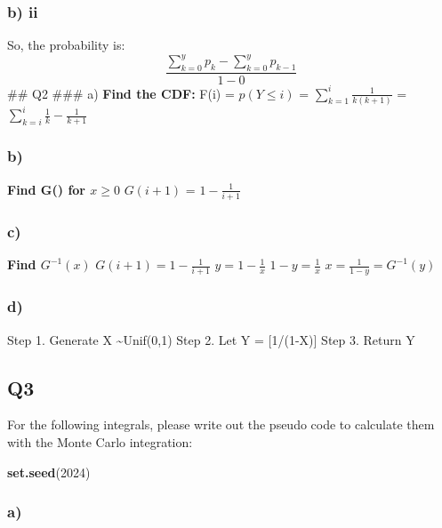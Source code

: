 \documentclass[
]{article}
\newenvironment{Shaded}{\begin{snugshade}}{\end{snugshade}}
\newcommand{\DecValTok}[1]{\textcolor[rgb]{0.00,0.00,0.81}{#1}}
\newcommand{\FunctionTok}[1]{\textcolor[rgb]{0.13,0.29,0.53}{\textbf{#1}}}
\newcommand{\NormalTok}[1]{#1}
\begin{document}
\hypertarget{b-ii}{%
\subsubsection{b) ii}\label{b-ii}}

So, the probability is:
\[\frac{\sum^{y}_{k=0}{p_{k}}-\sum^{y}_{k=0}{p_{k-1}}}{1-0}\] \#\# Q2
\#\#\# a) \textbf{Find the CDF:} F(i) = \(p(Y \le i)\) =
\(\sum^{i}_{k=1}{\frac{1}{k(k+1)}}\) =
\(\sum^{i}_{k=i}{\frac{1}{k}-\frac{1}{k+1}}\)

\hypertarget{b}{%
\subsubsection{b)}\label{b}}

\textbf{Find G() for \(x \ge 0\)} \(G(i + 1)\) = \(1-\frac{1}{i+1}\)

\hypertarget{c}{%
\subsubsection{c)}\label{c}}

\textbf{Find \(G^{-1}(x)\)} \(G(i+1) = 1-\frac{1}{i+1}\)
\(y=1-\frac{1}{x}\) \(1-y=\frac{1}{x}\) \(x=\frac{1}{1-y} = G^{-1}(y)\)

\hypertarget{d}{%
\subsubsection{d)}\label{d}}

Step 1. Generate X \textasciitilde Unif(0,1) Step 2. Let Y =
{[}1/(1-X){]} Step 3. Return Y

\hypertarget{q3}{%
\subsection{Q3}\label{q3}}

For the following integrals, please write out the pseudo code to
calculate them with the Monte Carlo integration:

\begin{Shaded}
\begin{Highlighting}[]
\FunctionTok{set.seed}\NormalTok{(}\DecValTok{2024}\NormalTok{)}
\end{Highlighting}
\end{Shaded}

\hypertarget{a}{%
\subsubsection{a)}\label{a}}
\end{document}
